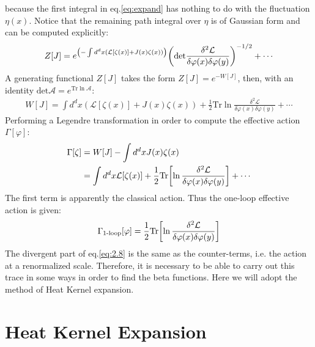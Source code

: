 because the first integral in eq.\ref{eq:expand} has nothing to do with the fluctuation $\eta(x)$. Notice that the remaining path integral over $\eta$ is of Gaussian form and can be computed explicitly:
\begin{align}
    Z[J] = e^ {\qty (-\int d^{d}x (\mathcal {L} [\zeta (x)] + J(x) \zeta (x)))} \qty (\text{det} \frac{\delta ^{2} \mathcal{L}}{\delta \varphi(x) \delta \varphi(y)})^{-1/2} + \cdots
\end{align}
A generating functional $Z[J]$ takes the form $Z[J] = e^{-W[J]}$, then, with an identity $\text{det} \mathcal{A} = e^{\text{Tr} \ln \mathcal{A}}$:
\begin{align}
    W[J] = \int d^{d}x (\mathcal {L} [\zeta (x)] + J(x) \zeta (x)) + \frac{1}{2} \text{Tr} \ln \frac{\delta ^{2} \mathcal{L}}{\delta \varphi(x) \delta \varphi(y)} + \cdots
\end{align}
Performing a Legendre transformation in order to compute the effective action $\Gamma[\varphi]$:
\begin{align}
    \Gamma[\zeta] &= W[J] - \int d^{d} x J(x)\zeta(x) \nonumber \\
    & = \int d^{d}x \mathcal{L} [\zeta(x)] + \frac{1}{2} \text{Tr} \qty[\ln \frac{\delta ^{2} \mathcal{L}}{\delta \varphi(x) \delta \varphi(y)}] + \cdots
\end{align}
The first term is apparently the classical action. Thus the one-loop effective action is given:
\begin{align}
    \label{eq:2.8}
    \Gamma_{\text{1-loop}} [\varphi] = \frac{1}{2} \text{Tr} \qty[\ln \frac{\delta ^{2} \mathcal{L}}{\delta \varphi(x) \delta \varphi(y)}]
\end{align}
The divergent part of eq.\ref{eq:2.8} is the same as the counter-terms, i.e. the action at a renormalized scale. Therefore, it is necessary to be able to carry out this trace in some ways in order to find the beta functions. Here we will adopt the method of Heat Kernel expansion. 

\section{Heat Kernel Expansion}
